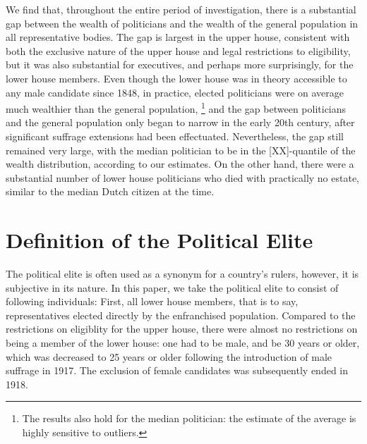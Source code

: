 We find that, throughout the entire period of investigation, there is a substantial gap between the wealth of politicians and the wealth of the general population in all representative bodies. The gap is largest in the upper house, consistent with both the exclusive nature of the upper house and legal restrictions to eligibility, but it was also substantial for executives, and perhaps more surprisingly, for the lower house members. Even though the lower house was in theory accessible to any male candidate since 1848, in practice, elected politicians were on average much wealthier than the general population, \footnote{The results also hold for the median politician: the estimate of the average is highly sensitive to outliers.} and the gap between politicians and the general population only began to narrow in the early 20th century, after significant suffrage extensions had been effectuated. Nevertheless, the gap still remained very large, with the median politician to be in the [XX]-quantile of the wealth distribution, according to our estimates. On the other hand, there were a substantial number of lower house politicians who died with practically no estate, similar to the median Dutch citizen at the time. 


\section{Definition of the Political Elite}
The political elite is often used as a synonym for a country's rulers, however, it is subjective in its nature. In this paper, we take the political elite to consist of following individuals: First, all lower house members, that is to say, representatives elected directly by the enfranchised population. Compared to the restrictions on eligiblity for the upper house, there were almost no restrictions on being a member of the lower house: one had to be male, and be 30 years or older, which was decreased to 25 years or older following the introduction of male suffrage in 1917. The exclusion of female candidates was subsequently ended in 1918. \autocite{van2018tussen} 

